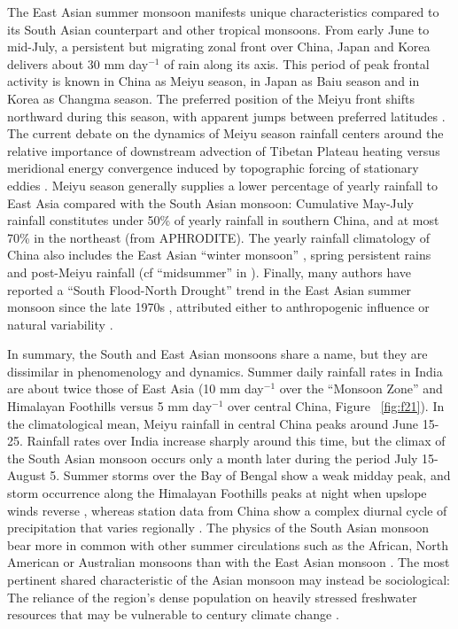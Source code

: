 	The East Asian summer monsoon manifests unique characteristics compared to its South Asian counterpart and other tropical monsoons. From early June to mid-July, a persistent but migrating zonal front over China, Japan and Korea delivers about 30 mm day$^{-1}$ of rain along its axis. This period of peak frontal activity is known in China as Meiyu season, in Japan as Baiu season and in Korea as Changma season. The preferred position of the Meiyu front shifts northward during this season, with apparent jumps between preferred latitudes \citep{Ding2005}. The current debate on the dynamics of Meiyu season rainfall centers around the relative importance of downstream advection of Tibetan Plateau heating \citep{Sampe2010} versus meridional energy convergence induced by topographic forcing of stationary eddies \citep{Molnar2010,Chen2014}. Meiyu season generally supplies a lower percentage of yearly rainfall to East Asia compared with the South Asian monsoon: Cumulative May-July rainfall constitutes under 50\% of yearly rainfall in southern China, and at most 70\% in the northeast (from APHRODITE). The yearly rainfall climatology of China also includes the East Asian ``winter monsoon'' \citep{Jhun2004}, spring persistent rains \citep{Tian1998} and post-Meiyu rainfall (cf ``midsummer'' in \cite{Kosaka2011}). Finally, many authors have reported a ``South Flood-North Drought'' trend in the East Asian summer monsoon since the late 1970s \citep{Gong2002,Ding2008}, attributed either to anthropogenic influence or natural variability \citep{Song2014,Lei2014}.
		
	In summary, the South and East Asian monsoons share a name, but they are dissimilar in phenomenology and dynamics. Summer daily rainfall rates in India are about twice those of East Asia (10 mm day$^{-1}$ over the ``Monsoon Zone'' and Himalayan Foothills versus 5 mm day$^{-1}$ over central China, Figure ~\ref{fig:f21}). In the climatological mean, Meiyu rainfall in central China peaks around June 15-25. Rainfall rates over India increase sharply around this time, but the climax of the South Asian monsoon occurs only a month later during the period July 15-August 5. Summer storms over the Bay of Bengal show a weak midday peak, and storm occurrence along the Himalayan Foothills peaks at night when upslope winds reverse \citep{Romatschke2011a}, whereas station data from China show a complex diurnal cycle of precipitation that varies regionally \citep{Zhou2008}. The physics of the South Asian monsoon bear more in common with other summer circulations such as the African, North American or Australian monsoons than with the East Asian monsoon \citep{Rodwell2001}. The most pertinent shared characteristic of the Asian monsoon may instead be sociological: The reliance of the region's dense population on heavily stressed freshwater resources that may be vulnerable to  century climate change \citep{Gleeson2012,JimenezCisneros2014}. 
		
